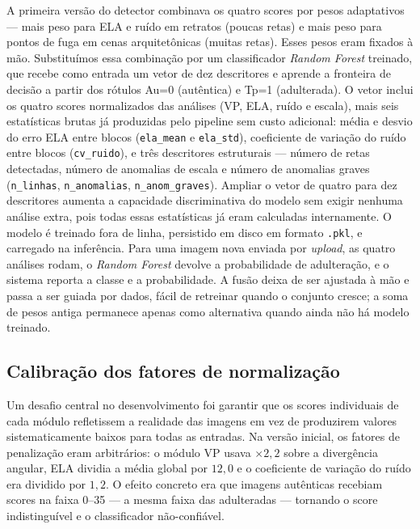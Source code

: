\documentclass[12pt]{article}
\begin{document}
A primeira versão do detector combinava os quatro scores por pesos adaptativos ---
mais peso para ELA e ruído em retratos (poucas retas) e mais peso para pontos de
fuga em cenas arquitetônicas (muitas retas). Esses pesos eram fixados à mão.
Substituímos essa combinação por um classificador \textit{Random Forest} treinado,
que recebe como entrada um vetor de dez descritores e aprende a fronteira de
decisão a partir dos rótulos Au=0 (autêntica) e Tp=1 (adulterada). O vetor inclui
os quatro scores normalizados das análises (VP, ELA, ruído e escala), mais seis
estatísticas brutas já produzidas pelo pipeline sem custo adicional: média e desvio
do erro ELA entre blocos (\texttt{ela\_mean} e \texttt{ela\_std}), coeficiente de
variação do ruído entre blocos (\texttt{cv\_ruido}), e três descritores estruturais
--- número de retas detectadas, número de anomalias de escala e número de anomalias
graves (\texttt{n\_linhas}, \texttt{n\_anomalias}, \texttt{n\_anom\_graves}).
Ampliar o vetor de quatro para dez descritores aumenta a capacidade discriminativa
do modelo sem exigir nenhuma análise extra, pois todas essas estatísticas já eram
calculadas internamente. O modelo é treinado fora de linha, persistido em disco em
formato \texttt{.pkl}, e carregado na inferência. Para uma imagem nova enviada por
\textit{upload}, as quatro análises rodam, o \textit{Random Forest} devolve a
probabilidade de adulteração, e o sistema reporta a classe e a probabilidade. A
fusão deixa de ser ajustada à mão e passa a ser guiada por dados, fácil de
retreinar quando o conjunto cresce; a soma de pesos antiga permanece apenas como
alternativa quando ainda não há modelo treinado.

\subsection{Calibração dos fatores de normalização}

Um desafio central no desenvolvimento foi garantir que os scores individuais de
cada módulo refletissem a realidade das imagens em vez de produzirem valores
sistematicamente baixos para todas as entradas. Na versão inicial, os fatores de
penalização eram arbitrários: o módulo VP usava $\times 2{,}2$ sobre a divergência
angular, ELA dividia a média global por $12{,}0$ e o coeficiente de variação do
ruído era dividido por $1{,}2$. O efeito concreto era que imagens autênticas
recebiam scores na faixa 0--35 --- a mesma faixa das adulteradas --- tornando o
score indistinguível e o classificador não-confiável.
\end{document}
